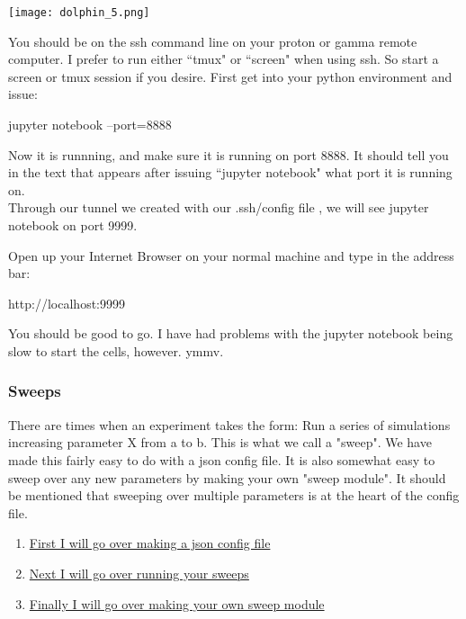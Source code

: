\documentclass[titlepage]{article}
\makeatletter
\renewcommand\paragraph{\@startsection{paragraph}{4}{\z@}{-3.25ex \@plus1ex \@minus.2ex}{10pt}{\sffamily\normalsize\bfseries}}
\makeatother
\begin{document}
\texttt{[image: dolphin\_5.png]} \\

\hypertarget{jupyter_access}{}
\paragraph{Jupyter Notebook}

You should be on the ssh command line on your proton or gamma remote computer.  I prefer to run either ``tmux" or ``screen" when using ssh.  So start
a screen or tmux session if you desire.  First get into your python environment and issue:
\begin{terminal}
jupyter notebook --port=8888
\end{terminal}

Now it is runnning, and make sure it is running on port 8888.  It should tell you in the text that appears after issuing ``jupyter notebook" what port it is
running on.\\

Through our tunnel we created with our .ssh/config file , we will see jupyter notebook on port 9999.

Open up your Internet Browser on your normal machine and type in the address bar:
\begin{code}
http://localhost:9999
\end{code}

You should be good to go.  I have had problems with the jupyter notebook being slow to start the cells, however. ymmv.

\subsubsection{Sweeps}
There are times when an experiment takes the form:  Run a series of simulations increasing parameter X from a to b.  This is what we call a "sweep".
We have made this fairly easy to do with a json config file.  It is also somewhat easy to sweep over any new parameters by making your own "sweep module".
It should be mentioned that sweeping over multiple parameters is at the heart of the config file.
\begin{enumerate}
  \item \hyperlink{sweep_config}{First I will go over making a json config file}
  \item \hyperlink{sweep_run}{Next I will go over running your sweeps}
  \item \hyperlink{sweep_module}{Finally I will go over making your own sweep module}
\end{enumerate}
\end{document}
